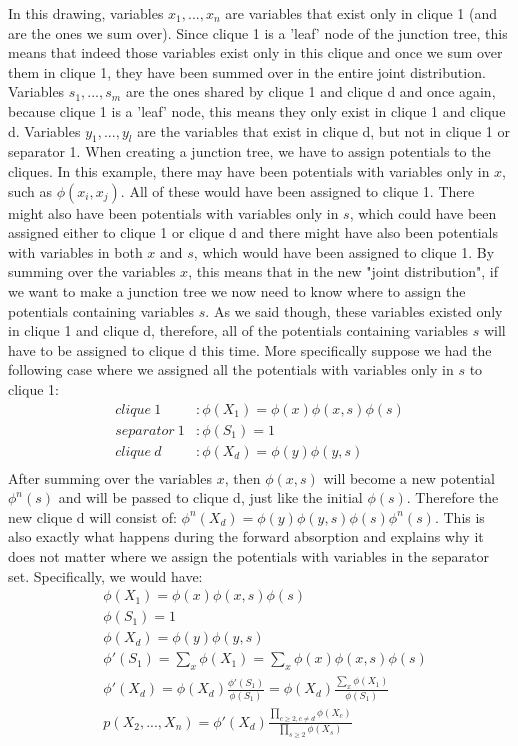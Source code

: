 \documentclass[11pt,a4paper,oneside]{report}
\begin{document}
	In this drawing, variables $x_1,...,x_n$ are variables that exist only in clique 1 (and are the ones we sum over). Since clique 1 is a 'leaf' node of the junction tree, this means that indeed those variables exist only in this clique and once we sum over them in clique 1, they have been summed over in the entire joint distribution. Variables $s_1,...,s_m$ are the ones shared by clique 1 and clique d and once again, because clique 1 is a 'leaf' node, this means they only exist in clique 1 and clique d. Variables $y_1,...,y_l$ are the variables that exist in clique d, but not in clique 1 or separator 1. When creating a junction tree, we have to assign potentials to the cliques. In this example, there may have been potentials with variables only in $x$, such as $\phi(x_i,x_j)$. All of these would have been assigned to clique 1. There might also have been potentials with variables only in $s$, which could have been assigned either to clique 1 or clique d and there might have also been potentials with variables in both $x$ and $s$, which would have been assigned to clique 1. By summing over the variables $x$, this means that in the new "joint distribution", if we want to make a junction tree we now need to know where to assign the potentials containing variables $s$. As we said though, these variables existed only in clique 1 and clique d, therefore, all of the potentials containing variables $s$ will have to be assigned to clique d this time. More specifically suppose we had the following case where we assigned all the potentials with variables only in $s$ to clique 1:
	\begin{align*}
	clique\ 1&:\phi(X_1) = \phi(x)\phi(x,s)\phi(s)\\
	separator\ 1&:\phi(S_1) = 1\\
	clique\ d&:\phi(X_d) = \phi(y)\phi(y,s)\\
	\end{align*}
	After summing over the variables $x$, then $\phi(x,s)$ will become a new potential $\phi^n(s)$ and will be passed to clique d, just like the initial $\phi(s)$. Therefore the new clique d will consist of: $\phi^n(X_d)=\phi(y)\phi(y,s)\phi(s)\phi^n(s)$. This is also exactly what happens during the forward absorption and explains why it does not matter where we assign the potentials with variables in the separator set. Specifically, we would have:
	\begin{align*}
	&\phi(X_1) = \phi(x)\phi(x,s)\phi(s)\\
	&\phi(S_1) = 1\\
	&\phi(X_d) = \phi(y)\phi(y,s)\\
	&\phi'(S_1) = \sum_{x}\phi(X_1)=\sum_{x}\phi(x)\phi(x,s)\phi(s)\\
	&\phi'(X_d) = \phi(X_d)\frac{\phi'(S_1)}{\phi(S_1)}=\phi(X_d)\frac{\sum_{x}\phi(X_1)}{\phi(S_1)}\\
	&p(X_2,...,X_n)=\phi'(X_d)\frac{\prod_{c \geq 2,c\neq d}\phi(X_c)}{\prod_{s \geq 2}\phi(X_s)}
	\end{align*}	
	
\end{document}
